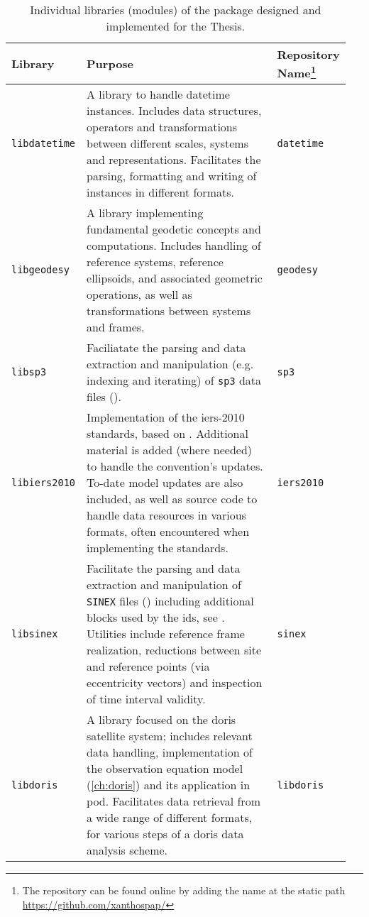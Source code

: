 \begin{table}[h!]
  \centering
  \begin{tabular}{p{0.20\linewidth} | p{0.60\linewidth} | p{0.15\linewidth}}
    \textbf{Library} & \textbf{Purpose} & \textbf{Repository Name}\footnote{The repository can be found online by adding the name at the static path \url{https://github.com/xanthospap/}} \\
    \toprule
    
    \texttt{libdatetime} & A library to handle datetime instances. Includes data structures, 
      operators and transformations between different scales, systems and representations. 
      Facilitates the parsing, formatting and writing of instances in different formats.
      & \texttt{datetime} \\
    
    \texttt{libgeodesy} & A library implementing fundamental geodetic concepts and 
      computations. Includes handling of reference systems, reference ellipsoids, 
      and associated geometric operations, as well as transformations between 
      systems and frames. & \texttt{geodesy} \\

    \texttt{libsp3} & Faciliatate the parsing and data extraction and manipulation 
      (e.g. indexing and iterating) of \texttt{sp3} data files (\cite{Hilla2010}). 
      & \texttt{sp3} \\
    
    \texttt{libiers2010} & Implementation of the \gls{iers}-2010 standards, based on  
      \cite{iers2010}. Additional material is added (where needed) to handle the 
      convention's updates. To-date model updates are also included, as well as 
      source code to handle data resources in various formats, often encountered 
      when implementing the standards.
      & \texttt{iers2010} \\
    
    \texttt{libsinex} & Facilitate the parsing and data extraction and manipulation 
      of \texttt{SINEX} files (\cite{Sinex202}) including additional blocks 
      used by the \gls{ids}, see \cite{Moreaux2023}. Utilities include reference 
      frame realization, reductions between site and reference points (via eccentricity 
      vectors) and inspection of time interval validity.
      & \texttt{sinex} \\
    
    \texttt{libdoris} & A library focused on the \gls{doris} satellite system; includes 
      relevant data handling, implementation of the observation equation model 
      (\autoref{ch:doris}) and its application in \gls{pod}. Facilitates data 
      retrieval from a wide range of different formats, for various steps of a
      \gls{doris} data analysis scheme.
      & \texttt{libdoris} \\
      \bottomrule
  \end{tabular}
  \caption{Individual libraries (modules) of the package designed and implemented for the Thesis.}
  \label{table:software-components2}
\end{table}

